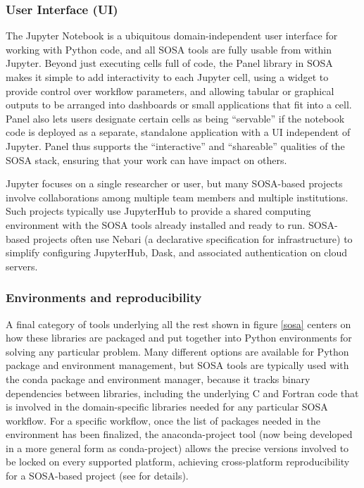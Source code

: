 \subsubsection{User Interface (UI)}

The Jupyter Notebook is a ubiquitous domain-independent user interface for working with Python code, and all SOSA tools are fully usable from within Jupyter. Beyond just executing cells full of code, the Panel library in SOSA makes it simple to add interactivity to each Jupyter cell, using a widget to provide control over workflow parameters, and allowing tabular or graphical outputs to be arranged into dashboards or small applications that fit into a cell. Panel also lets users designate certain cells as being ``servable'' if the notebook code is deployed as a separate, standalone application with a UI independent of Jupyter. Panel thus supports the ``interactive'' and ``shareable'' qualities of the SOSA stack, ensuring that your work can have impact on others.

Jupyter focuses on a single researcher or user, but many SOSA-based projects involve collaborations among multiple team members and multiple institutions. Such projects typically use JupyterHub to provide a shared computing environment with the SOSA tools already installed and ready to run. SOSA-based projects often use Nebari (a declarative specification for infrastructure) to simplify configuring JupyterHub, Dask, and associated authentication on cloud servers.

\subsubsection{Environments and reproducibility}

A final category of tools underlying all the rest shown in figure \ref{sosa} centers on how these libraries are packaged and put together into Python environments for solving any particular problem. Many different options are available for Python package and environment management, but SOSA tools are typically used with the conda package and environment manager, because it tracks binary dependencies between libraries, including the underlying C and Fortran code that is involved in the domain-specific libraries needed for any particular SOSA workflow. For a specific workflow, once the list of packages needed in the environment has been finalized, the anaconda-project tool (now being developed in a more general form as conda-project) allows the precise versions involved to be locked on every supported platform, achieving cross-platform reproducibility for a SOSA-based project (see
\cite{bednar:anaconda22} for details).


